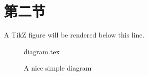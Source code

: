 \documentclass[float=false, crop=false]{standalone}
\begin{document}
    
    \section{第二节}
    A TikZ figure will be rendered below this line.
    \begin{figure}[ht]
        \centering
        {diagram.tex}
        \label{fig:tikzexample}
        \caption{A nice simple diagram}
    \end{figure}
\end{document}
